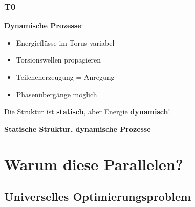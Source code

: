 	\subsubsection{T0}
	
	\textbf{Dynamische Prozesse}:
	\begin{itemize}
		\item Energieflüsse im Torus variabel
		\item Torsionswellen propagieren
		\item Teilchenerzeugung = Anregung
		\item Phasenübergänge möglich
	\end{itemize}
	
	Die Struktur ist \textbf{statisch}, aber Energie \textbf{dynamisch}!
	

		\textbf{Statische Struktur, dynamische Prozesse}
		
		\vspace{0.3cm}
		
		\begin{center}
		\end{center}

	
	\section{Warum diese Parallelen?}
	
	\subsection{Universelles Optimierungsproblem}
	
